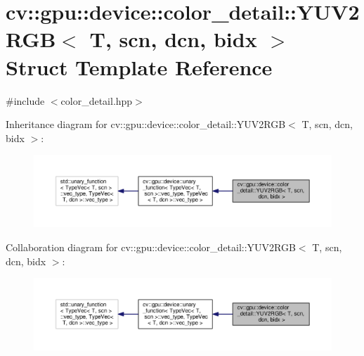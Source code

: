 \hypertarget{structcv_1_1gpu_1_1device_1_1color__detail_1_1YUV2RGB}{\section{cv\-:\-:gpu\-:\-:device\-:\-:color\-\_\-detail\-:\-:Y\-U\-V2\-R\-G\-B$<$ T, scn, dcn, bidx $>$ Struct Template Reference}
\label{structcv_1_1gpu_1_1device_1_1color__detail_1_1YUV2RGB}
}


{\ttfamily \#include $<$color\-\_\-detail.\-hpp$>$}



Inheritance diagram for cv\-:\-:gpu\-:\-:device\-:\-:color\-\_\-detail\-:\-:Y\-U\-V2\-R\-G\-B$<$ T, scn, dcn, bidx $>$\-:\nopagebreak
\begin{figure}[H]
\begin{center}
\leavevmode
\includegraphics[width=350pt]{structcv_1_1gpu_1_1device_1_1color__detail_1_1YUV2RGB__inherit__graph}
\end{center}
\end{figure}


Collaboration diagram for cv\-:\-:gpu\-:\-:device\-:\-:color\-\_\-detail\-:\-:Y\-U\-V2\-R\-G\-B$<$ T, scn, dcn, bidx $>$\-:\nopagebreak
\begin{figure}[H]
\begin{center}
\leavevmode
\includegraphics[width=350pt]{structcv_1_1gpu_1_1device_1_1color__detail_1_1YUV2RGB__coll__graph}
\end{center}
\end{figure}
